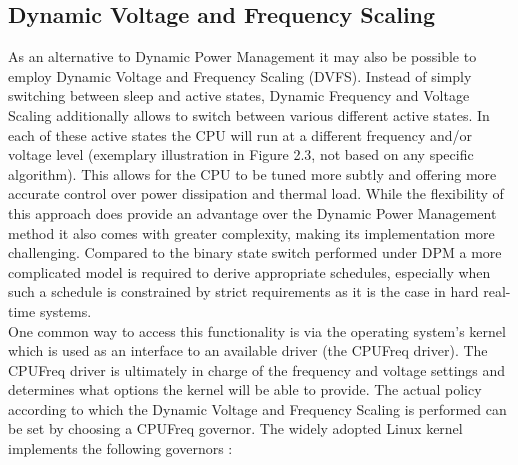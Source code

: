 \subsection{Dynamic Voltage and Frequency Scaling}
As an alternative to Dynamic Power Management it may also be possible to employ Dynamic Voltage and Frequency Scaling (DVFS). Instead of simply switching between sleep and active states, Dynamic Frequency and Voltage Scaling additionally allows to switch between various different active states. In each of these active states the CPU will run at a different frequency and/or voltage level (exemplary illustration in Figure 2.3, not based on any specific algorithm). This allows for the CPU to be tuned more subtly and offering more accurate control over power dissipation and thermal load. While the flexibility of this approach does provide an advantage over the Dynamic Power Management method it also comes with greater complexity, making its implementation more challenging. Compared to the binary state switch performed under DPM a more complicated model is required to derive appropriate schedules, especially when such a schedule is constrained by strict requirements as it is the case in hard real-time systems.\\
\hspace*{0.5ex}\hspace{0.5ex} One common way to access this functionality is via the operating system's kernel which is used as an interface to an available driver (the CPUFreq driver). The CPUFreq driver is ultimately in charge of the frequency and voltage settings and determines what options the kernel will be able to provide. The actual policy according to which the Dynamic Voltage and Frequency Scaling is performed can be set by choosing a CPUFreq governor. The widely adopted Linux kernel implements the following governors \cite{Brodowski}:
